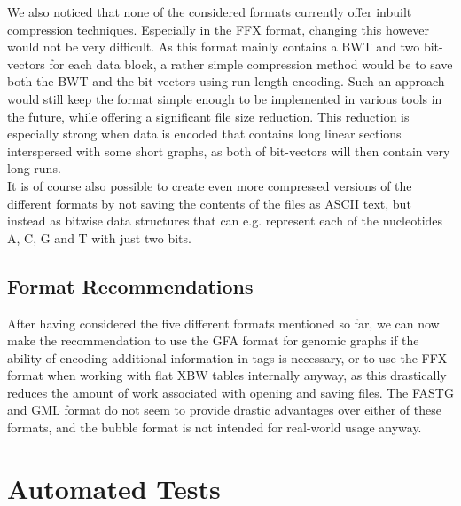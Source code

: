 \documentclass[a4paper,12pt,twoside,BCOR=10mm]{scrbook}
\begin{document}
We also noticed that none of the considered formats currently offer inbuilt compression techniques. 
Especially in the FFX format, changing this however would not be very difficult. 
As this format mainly contains a BWT and two bit-vectors for each data block, 
a rather simple compression method would be to save both the BWT and the bit-vectors 
using run-length encoding. 
Such an approach would still keep the format simple enough to be implemented in various 
tools in the future, while offering a significant file size reduction. 
This reduction is especially strong when data is encoded that contains long linear sections 
interspersed with some short graphs, as both of bit-vectors will then 
contain very long runs. \\
It is of course also possible to create even more compressed versions 
of the different formats by not saving the contents of the files as ASCII text, 
but instead as bitwise data structures that can e.g. represent each of the nucleotides A, C, G and T with 
just two bits.

\subsection{Format Recommendations}

After having considered the five different formats mentioned so far, 
we can now make the recommendation to use the GFA format for genomic graphs 
if the ability of encoding additional information in tags is necessary, 
or to use the FFX format when working with flat XBW tables internally anyway, 
as this drastically reduces the amount of work associated with opening and saving files. 
The FASTG and GML format do not seem to provide drastic advantages over either of these formats, 
and the bubble format is not intended for real-world usage anyway.

\section{Automated Tests}
%
\end{document}
